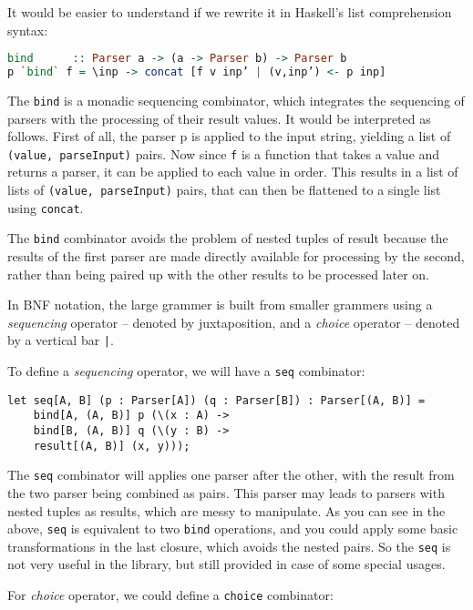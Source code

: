 It would be easier to understand if we rewrite it in Haskell's list comprehension syntax:

\begin{lstlisting}[language=Haskell]
bind      :: Parser a -> (a -> Parser b) -> Parser b
p `bind` f = \inp -> concat [f v inp’ | (v,inp’) <- p inp]
\end{lstlisting}

The \texttt{bind} is a monadic sequencing combinator, which integrates the sequencing of parsers with the processing of their result values. It would be interpreted as follows. First of all, the parser p is applied to the input string, yielding a list of \texttt{(value, parseInput)} pairs. Now since \texttt{f} is a function that takes a value and returns a parser, it can be applied to each value in order. This results in a list of lists of \texttt{(value, parseInput)} pairs, that can then be flattened to a single list using \texttt{concat}.

The \texttt{bind} combinator avoids the problem of nested tuples of result because the results of the first parser are made directly available for processing by the second, rather than being paired up with the other results to be processed later on.

In BNF notation, the large grammer is built from smaller grammers using a \textit{sequencing} operator -- denoted by juxtaposition, and a \textit{choice} operator -- denoted by a vertical bar \texttt{|}.

To define a \textit{sequencing} operator, we will have a \texttt{seq} combinator:

\begin{lstlisting}
let seq[A, B] (p : Parser[A]) (q : Parser[B]) : Parser[(A, B)] =
    bind[A, (A, B)] p (\(x : A) ->
    bind[B, (A, B)] q (\(y : B) ->
    result[(A, B)] (x, y)));
\end{lstlisting}

The \texttt{seq} combinator will applies one parser after the other, with the result from the two parser being combined as pairs. This parser may leads to parsers with nested tuples as results, which are messy to manipulate. As you can see in the above, \texttt{seq} is equivalent to two \texttt{bind} operations, and you could apply some basic transformations in the last closure, which avoids the nested pairs. So the \texttt{seq} is not very useful in the library, but still provided in case of some special usages.

For \textit{choice} operator, we could define a \texttt{choice} combinator:

